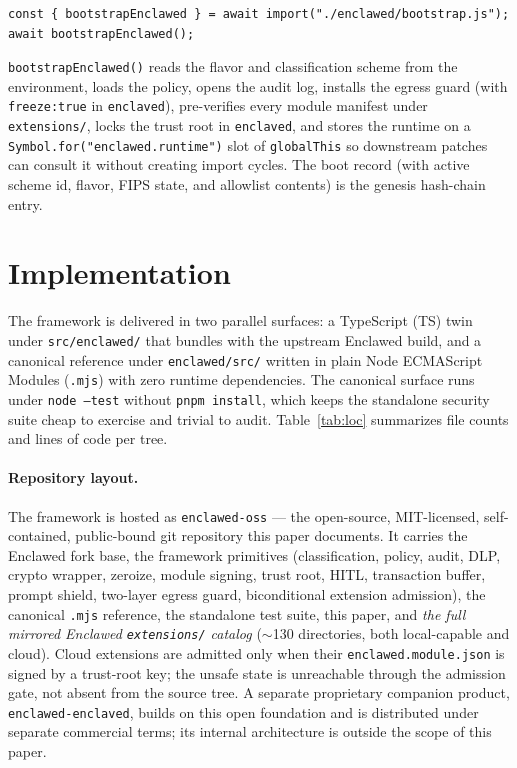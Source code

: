 \documentclass[11pt]{article}
\begin{document}
\begin{verbatim}
const { bootstrapEnclawed } = await import("./enclawed/bootstrap.js");
await bootstrapEnclawed();
\end{verbatim}

\texttt{bootstrapEnclawed()} reads the flavor and classification scheme
from the environment, loads the policy, opens the audit log, installs
the egress guard (with \texttt{freeze:true} in \texttt{enclaved}),
pre-verifies every module manifest under \texttt{extensions/}, locks the
trust root in \texttt{enclaved}, and stores the runtime on a
\texttt{Symbol.for("enclawed.runtime")} slot of \texttt{globalThis} so
downstream patches can consult it without creating import cycles. The
boot record (with active scheme id, flavor, FIPS state, and allowlist
contents) is the genesis hash-chain entry.

\section{Implementation}

The framework is delivered in two parallel surfaces: a TypeScript (TS)
twin under \texttt{src/enclawed/} that bundles with the upstream
Enclawed build, and a canonical reference under \texttt{enclawed/src/}
written in plain Node ECMAScript Modules (\texttt{.mjs}) with zero
runtime dependencies. The
canonical surface runs under \texttt{node --test} without
\texttt{pnpm install}, which keeps the standalone security suite cheap to
exercise and trivial to audit. Table~\ref{tab:loc} summarizes file counts
and lines of code per tree.

\paragraph{Repository layout.} The framework is hosted as
\texttt{enclawed-oss} --- the open-source, MIT-licensed, self-contained,
public-bound git repository this paper documents. It carries the
Enclawed fork base, the framework primitives (classification, policy,
audit, DLP, crypto wrapper, zeroize, module signing, trust root, HITL,
transaction buffer, prompt shield, two-layer egress guard, biconditional
extension admission), the canonical \texttt{.mjs} reference, the
standalone test suite, this paper, and \emph{the full mirrored Enclawed
\texttt{extensions/} catalog} (\(\sim\)130 directories, both
local-capable and cloud). Cloud extensions are admitted only when their
\texttt{enclawed.module.json} is signed by a trust-root key; the unsafe
state is unreachable through the admission gate, not absent from the
source tree. A separate proprietary companion product,
\texttt{enclawed-enclaved}, builds on this open foundation and is
distributed under separate commercial terms; its internal architecture
is outside the scope of this paper.
\end{document}
